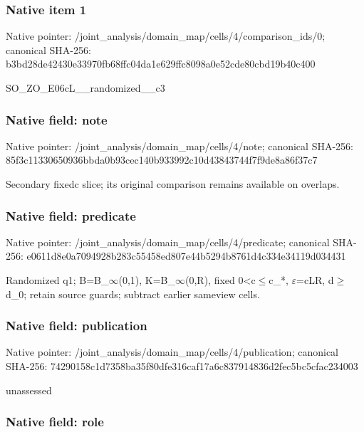 \documentclass[10pt,a4paper]{article}
\begin{document}
\subsubsection{Native item 1}


Native pointer: /joint\_analysis/domain\_m\allowbreak{}ap/cells/4/comparison\_id\allowbreak{}s/0; canonical SHA-256: b3bd28de42430e33970fb68f\allowbreak{}fc04da1e629ffc8098a0e52c\allowbreak{}de80cbd19b40c400


SO\_ZO\_E06cL\_\_randomized\_\_c3


\subsubsection{Native field: note}


Native pointer: /joint\_analysis/domain\_map/cells/4/note; canonical SHA-256: 85f3c11330650936bbda0b93\allowbreak{}cec140b933992c10d4384374\allowbreak{}4f7f9de8a86f37c7


Secondary fixedc slice; its original comparison remains available on overlaps.


\subsubsection{Native field: predicate}


Native pointer: /joint\_analysis/domain\_m\allowbreak{}ap/cells/4/predicate; canonical SHA-256: e0611d8e0a7094928b283c55\allowbreak{}458ed807e44b5294b8761d4c\allowbreak{}334e34119d034431


Randomized q1; B=B\_\ensuremath{\infty}(0,1), K=B\_\ensuremath{\infty}(0,R), fixed 0<c\ensuremath{\le}c\_*, \ensuremath{\varepsilon}=cLR, d\ensuremath{\ge}d\_0; retain source guards; subtract earlier sameview cells.


\subsubsection{Native field: publication}


Native pointer: /joint\_analysis/domain\_m\allowbreak{}ap/cells/4/publication; canonical SHA-256: 74290158c1d7358ba35f80df\allowbreak{}e316caf17a6c837914836d2f\allowbreak{}ec5bc5cfac234003


unassessed


\subsubsection{Native field: role}
\end{document}
